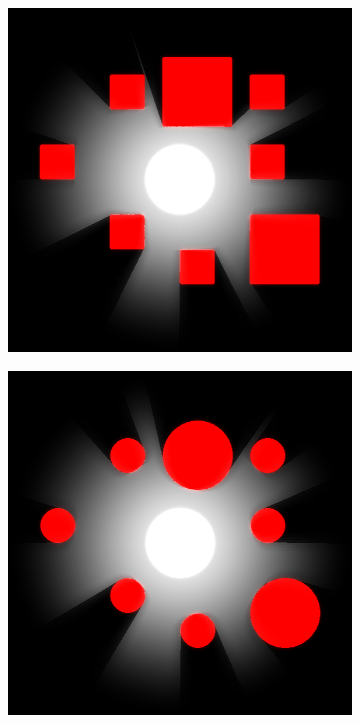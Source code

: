 \documentclass[../main/main.tex]{subfiles}
\begin{document}
\begin{figure}[H]
    \begin{subfigure}[b]{0.3\columnwidth}
    \includegraphics[width=\columnwidth]{../testing/assets/rays_example_1.png}
    \end{subfigure}
    \begin{subfigure}[b]{0.3\columnwidth}
    \includegraphics[width=\columnwidth]{../testing/assets/rays_example_2.png}

\end{subfigure}
\end{figure}
\end{document}
